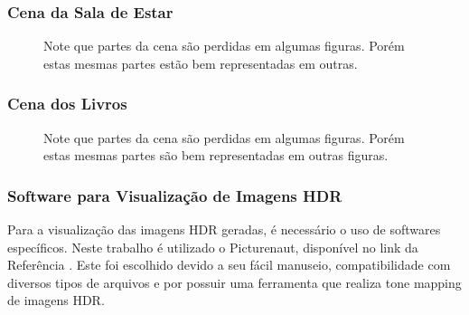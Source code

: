 \subsubsection{Cena da Sala de Estar} \label{cenaPorquinho}


\begin{figure}[H]
  \quad %
  \quad %
  \quad %
  \caption{Note que partes da cena são perdidas em algumas figuras. Porém estas mesmas partes estão bem representadas em outras.}
  \label{figBasePorquinho}
\end{figure}


\subsubsection{Cena dos Livros} \label{cenaOlhinhos}

\begin{figure}[H]
  \quad %
  \quad %
  \quad %
  \quad %
  \caption{Note que partes da cena são perdidas em algumas figuras. Porém estas mesmas partes são bem representadas em outras figuras.}
  \label{figBaseOlhinhos}
\end{figure}

\subsubsection{Software para Visualização de Imagens HDR} \label{baseImgPicturenaut}

Para a visualização das imagens HDR geradas, é necessário o uso de softwares específicos. Neste trabalho é utilizado o Picturenaut, disponível no link da Referência \cite{picturenaut}. Este foi escolhido devido a seu fácil manuseio, compatibilidade com diversos tipos de arquivos e por possuir uma ferramenta que realiza tone mapping de imagens HDR.
